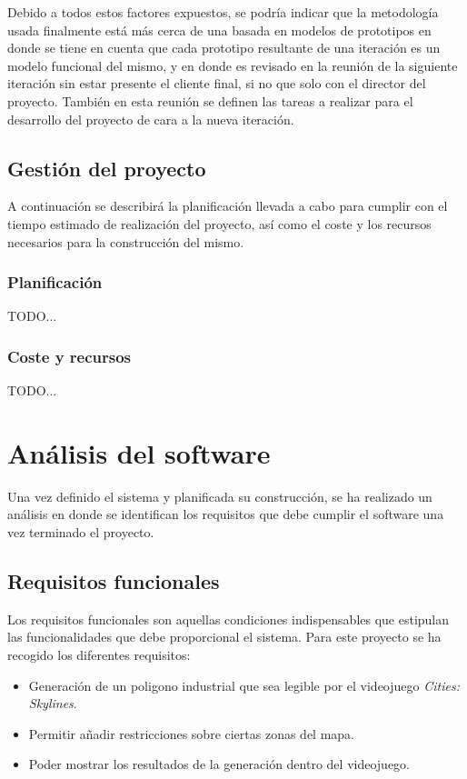 Debido a todos estos factores expuestos, se podría indicar que la metodología usada finalmente está más cerca de una basada en modelos de prototipos en donde se tiene en cuenta que cada prototipo resultante de una iteración es un modelo funcional del mismo, y en donde es revisado en la reunión de la siguiente iteración sin estar presente el cliente final, si no que solo con el director del proyecto. También en esta reunión se definen las tareas a realizar para el desarrollo del proyecto de cara a la nueva iteración.

\subsection{Gestión del proyecto}
\label{subsec:gestion}

A continuación se describirá la planificación llevada a cabo para cumplir con el tiempo estimado de realización del proyecto, así como el coste y los recursos necesarios para la construcción del mismo.

\subsubsection{Planificación}

TODO...

\subsubsection{Coste y recursos}

TODO...

\section{Análisis del software}

Una vez definido el sistema y planificada su construcción, se ha realizado un análisis en donde se identifican los requisitos que debe cumplir el software una vez terminado el proyecto.

\subsection{Requisitos funcionales}
\label{subsec:funcrequirements}

Los requisitos funcionales son aquellas condiciones indispensables que estipulan las funcionalidades que debe proporcional el sistema. Para este proyecto se ha recogido los diferentes requisitos:

\begin{itemize}
	\item Generación de un poligono industrial que sea legible por el videojuego \textit{Cities: Skylines\textcopyright}.
	\item Permitir añadir restricciones sobre ciertas zonas del mapa.
	\item Poder mostrar los resultados de la generación dentro del videojuego.
\end{itemize}

